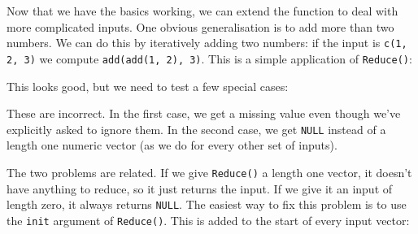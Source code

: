 Now that we have the basics working, we can extend the function to deal
with more complicated inputs. One obvious generalisation is to add more
than two numbers. We can do this by iteratively adding two numbers: if
the input is \texttt{c(1, 2, 3)} we compute \texttt{add(add(1, 2), 3)}.
This is a simple application of \texttt{Reduce()}:

\begin{Shaded}
\begin{Highlighting}[]
\StringTok{ } \NormalTok{) \{}
   
\NormalTok{\}}
\NormalTok{(}\NormalTok{(}\NormalTok{, }\NormalTok{, }\NormalTok{))}
\end{Highlighting}
\end{Shaded}

This looks good, but we need to test a few special cases:

\begin{Shaded}
\begin{Highlighting}[]
\NormalTok{(}\NormalTok{, } \NormalTok{)}
\NormalTok{(}\NormalTok{())}
\end{Highlighting}
\end{Shaded}

These are incorrect. In the first case, we get a missing value even
though we've explicitly asked to ignore them. In the second case, we get
\texttt{NULL} instead of a length one numeric vector (as we do for every
other set of inputs).

The two problems are related. If we give \texttt{Reduce()} a length one
vector, it doesn't have anything to reduce, so it just returns the
input. If we give it an input of length zero, it always returns
\texttt{NULL}. The easiest way to fix this problem is to use the
\texttt{init} argument of \texttt{Reduce()}. This is added to the start
of every input vector:

\begin{Shaded}
\begin{Highlighting}[]
\StringTok{ } \NormalTok{) \{}
    \NormalTok{)}
\NormalTok{\}}
\NormalTok{(}\NormalTok{(}\NormalTok{, }\NormalTok{, }\NormalTok{))}
\NormalTok{(}\NormalTok{, } \NormalTok{)}
\NormalTok{(}\NormalTok{())}
\end{Highlighting}
\end{Shaded}

